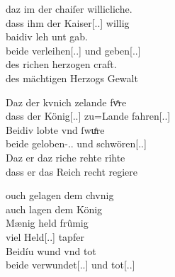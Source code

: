 \begin{exe}
\ex \label{ex:konjadjvvbeidiu}
	\begin{xlist}
	\ex \label{ex:konjadjvvbeidiu_1} %
		\gll daz im der chaiſer willicliche. \\
			dass ihm der Kaiser[\Nom.\Sg.\MascM] willig \\
	\sn \gll baidiv leh unt gab. \\
			beide verleihen[\Tsg\subM.\Ind.\Pst] und
			geben[\Tsg\subM.\Ind.\Pst] \\
	\sn \gll des richen herzogen craft. \\
			des mächtigen Herzogs Gewalt \\
		\begin{taggedline}{\parencites[\pno~73ra,19--21]{kc:A1}[vgl.][17108--17110]{schroeder1895}}
		\trans {}
		\end{taggedline}

	\ex \label{ex:konjadjvvbeidiu_2} %
		\gll Daz der kvnich zelande fvͦre \\
			dass der König[\Nom.\Sg.\MascM] zu=Lande
			fahren[\Tsg\subM.\Sbjv.\Pst] \\
	\sn \gll Beidiv lobte vnd ſwuͤre \\
			beide geloben-\Tsg\subM.\Sbjv.\Pst{} und
			schwören[\Tsg\subM.\Sbjv.\Pst] \\
	\sn \gll Daz er daz riche rehte rihte \\
			dass er das Reich recht regiere \\
		\begin{taggedline}{\parencites[\pno~102ra,43]{kc:VB}[zu][15366--15368]{schroeder1895}}
		\trans {}
		\end{taggedline}

	\ex \label{ex:konjadjvvbeidiu_3} %
		\begin{taggedline}{\parencites[\pno~42vb,42--44]{kc:B1}[vgl.][15880--15882]{schroeder1895}}
		\gll ouch gelagen dem chvnig \\
			auch lagen dem König \\
	\sn \gll Mænig held frûmig \\
			viel Held[\Nom.\Pl.\MascM] tapfer \\
	\sn \gll Beidíu wund vnd tot \\
			beide verwundet[\Nom.\Pl.\MascM] und tot[\Nom.\Pl.\MascM] \\
		\end{taggedline}


\end{xlist}
\end{exe}
